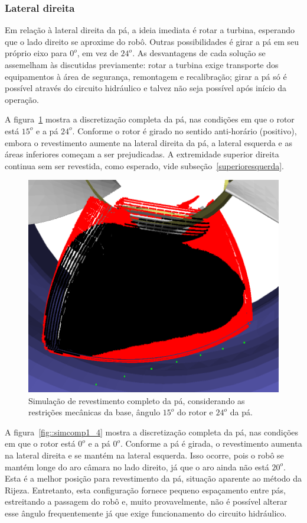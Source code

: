 \subsubsection{Lateral direita}
Em relação à lateral direita da pá, a ideia imediata é rotar a turbina,
esperando que o lado direito se aproxime do robô. Outras possibilidades é
girar a pá em seu próprio eixo para $0^o$, em vez de $24^o$. As desvantagens de
cada solução se assemelham às discutidas previamente: rotar a turbina exige
transporte dos equipamentos à área de segurança, remontagem e recalibração;
girar a pá só é possível através do circuito hidráulico e talvez não seja
possível após início da operação.

A figura~\ref{fig::simcomp1_2} mostra a discretização completa da pá, nas
condições em que o rotor está $15^o$ e a pá $24^o$. Conforme o rotor é
girado no sentido anti-horário (positivo), embora o revestimento aumente na
lateral direita da pá, a lateral esquerda e as áreas inferiores começam a ser
prejudicadas. A extremidade superior direita continua sem ser revestida, como
esperado, vide subseção~\ref{superioresquerda}.

\begin{figure}[!ht]
	\centering	
	\includegraphics[width=.5\columnwidth]{figs/simcomp1_2.png}
	\caption{Simulação de revestimento completo da pá, considerando as
	restrições mecânicas da base, ângulo $15^o$ do rotor e $24^o$ da pá.}
	\label{fig::simcomp1_2}
\end{figure}

A figura~\ref{fig::simcomp1_4} mostra a discretização completa da pá, nas
condições em que o rotor está $0^o$ e a pá $0^o$. Conforme a pá é girada, o
revestimento aumenta na lateral direita e se mantém na lateral esquerda. Isso
ocorre, pois o robô se mantém longe do aro câmara no lado direito, já que o aro
ainda não está $20^o$. Esta é a melhor posição para revestimento da pá,
situação aparente ao método da Rijeza. Entretanto, esta configuração fornece
pequeno espaçamento entre pás, estreitando a passagem do robô e, muito
provavelmente, não é possível alterar esse ângulo frequentemente já que exige
funcionamento do circuito hidráulico.

